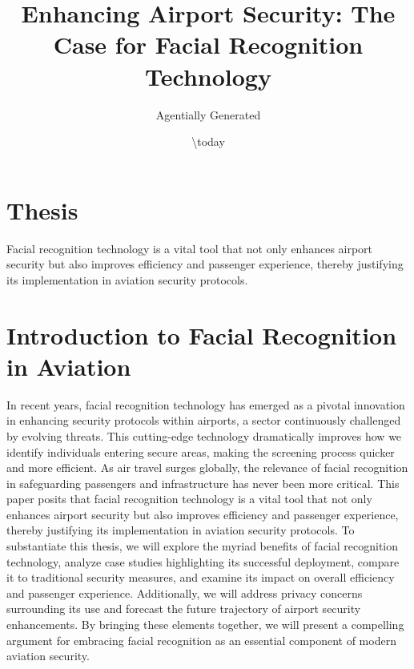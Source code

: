 \documentclass{article}%
\title{Enhancing Airport Security: The Case for Facial Recognition Technology}%
\author{Agentially Generated}%
\date{\textbackslash{}today}%
\begin{document}
%
\normalsize%
\maketitle%
\section{Thesis}%
\label{sec:Thesis}%
Facial recognition technology is a vital tool that not only enhances airport security but also improves efficiency and passenger experience, thereby justifying its implementation in aviation security protocols.

%
\section*{Introduction to Facial Recognition in Aviation}%
\label{sec:IntroductiontoFacialRecognitioninAviation}%
In recent years, facial recognition technology has emerged as a pivotal innovation in enhancing security protocols within airports, a sector continuously challenged by evolving threats. This cutting{-}edge technology dramatically improves how we identify individuals entering secure areas, making the screening process quicker and more efficient. As air travel surges globally, the relevance of facial recognition in safeguarding passengers and infrastructure has never been more critical. This paper posits that facial recognition technology is a vital tool that not only enhances airport security but also improves efficiency and passenger experience, thereby justifying its implementation in aviation security protocols. To substantiate this thesis, we will explore the myriad benefits of facial recognition technology, analyze case studies highlighting its successful deployment, compare it to traditional security measures, and examine its impact on overall efficiency and passenger experience. Additionally, we will address privacy concerns surrounding its use and forecast the future trajectory of airport security enhancements. By bringing these elements together, we will present a compelling argument for embracing facial recognition as an essential component of modern aviation security.

%
\end{document}
